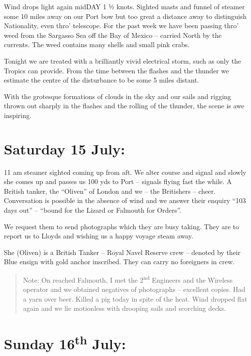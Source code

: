 \documentclass[
  11pt,
  msmallroyalvopaper
]{memoir}
\begin{document}
Wind drops light again midDAY 1 ½ knots. Sighted masts and funnel of
steamer some 10 miles away on our Port bow but too great a distance away
to distinguish Nationality, even thro' telescope. For the past week we
have been passing thro' weed from the Sargasso Sea off the Bay of Mexico
-- carried North by the currents. The weed contains many shells and
small pink crabs.

Tonight we are treated with a brilliantly vivid electrical storm, such
as only the Tropics can provide. From the time between the flashes and
the thunder we estimate the centre of the disturbance to be some 5 miles
distant.

With the grotesque formations of clouds in the sky and our sails and
rigging thrown out sharply in the flashes and the rolling of the
thunder, the scene is awe inspiring.

\hypertarget{saturday-15-july}{%
\section{Saturday 15 July:}\label{saturday-15-july}}

11 am steamer sighted coming up from aft. We alter course and signal and
slowly she comes up and passes us 100 yds to Port -- signals flying fast
the while. A British tanker, the ``Oliven'' of London and we -- the
Britishers -- cheer. Conversation is possible in the absence of wind and
we answer their enquiry ``103 days out'' -- ``bound for the Lizard or
Falmouth for Orders''.

We request them to send photographs which they are busy taking. They are
to report us to Lloyds and wishing us a happy voyage steam away.

She (Oliven) is a British Tanker -- Royal Navel Reserve crew -- denoted
by their Blue ensign with gold anchor inscribed. They can carry no
foreigners in crew.

\begin{quote}
Note: On reached Falmouth, I met the 2\textsuperscript{nd} Engineers and
the Wireless operator and we obtained negatives of photographs --
excellent copies. Had a yarn over beer. Killed a pig today in spite of
the heat. Wind dropped flat again and we lie motionless with drooping
sails and scorching decks.
\end{quote}

\hypertarget{sunday-16th-july}{%
\section{\texorpdfstring{Sunday 16\textsuperscript{th}
July:}{Sunday 16th July:}}\label{sunday-16th-july}}
\end{document}

